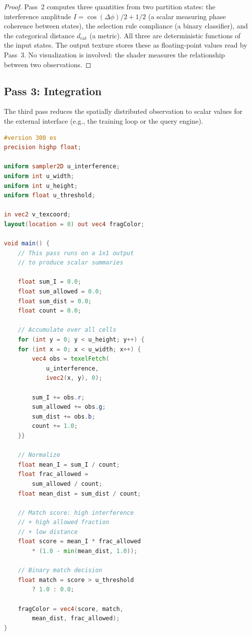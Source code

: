 \documentclass[11pt,twocolumn,a4paper]{article}
\theoremstyle{definition}
\theoremstyle{remark}
\newcommand{\dcat}{d_{\mathrm{cat}}}
\begin{document}
\begin{proof}
Pass~2 computes three quantities from two partition states: the interference amplitude $I = \cos(\Delta\phi)/2 + 1/2$ (a scalar measuring phase coherence between states), the selection rule compliance (a binary classifier), and the categorical distance $\dcat$ (a metric). All three are deterministic functions of the input states. The output texture stores these as floating-point values read by Pass~3. No visualization is involved: the shader measures the relationship between two observations.
\end{proof}

\subsection{Pass 3: Integration}
\label{sec:pass3}

The third pass reduces the spatially distributed observation to scalar values for the external interface (e.g., the training loop or the query engine).

\begin{lstlisting}[language=GLSL,caption={Pass 3: Integration (scalar extraction)},label=lst:pass3]
#version 300 es
precision highp float;

uniform sampler2D u_interference;
uniform int u_width;
uniform int u_height;
uniform float u_threshold;

in vec2 v_texcoord;
layout(location = 0) out vec4 fragColor;

void main() {
    // This pass runs on a 1x1 output
    // to produce scalar summaries

    float sum_I = 0.0;
    float sum_allowed = 0.0;
    float sum_dist = 0.0;
    float count = 0.0;

    // Accumulate over all cells
    for (int y = 0; y < u_height; y++) {
    for (int x = 0; x < u_width; x++) {
        vec4 obs = texelFetch(
            u_interference,
            ivec2(x, y), 0);

        sum_I += obs.r;
        sum_allowed += obs.g;
        sum_dist += obs.b;
        count += 1.0;
    }}

    // Normalize
    float mean_I = sum_I / count;
    float frac_allowed =
        sum_allowed / count;
    float mean_dist = sum_dist / count;

    // Match score: high interference
    // + high allowed fraction
    // + low distance
    float score = mean_I * frac_allowed
        * (1.0 - min(mean_dist, 1.0));

    // Binary match decision
    float match = score > u_threshold
        ? 1.0 : 0.0;

    fragColor = vec4(score, match,
        mean_dist, frac_allowed);
}
\end{lstlisting}
\end{document}
